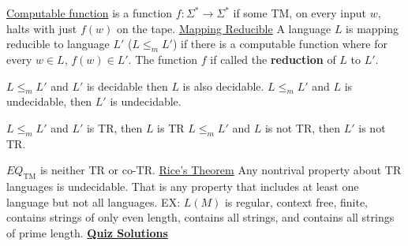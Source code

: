 \documentclass[9pt]{article}
\begin{document}
\uline{Computable function} is a function $f:\Sigma^*\rightarrow\Sigma^*$ if some TM, on every input $w$, halts with just $f(w)$ on the tape.\newline
\uline{Mapping Reducible} A language $L$ is mapping reducible to language $L'$ ($L\leq_mL'$) if there is a computable function where for every $w\in L$, $f(w)\in L'$. The function $f$ if called the \textbf{reduction} of $L$ to $L'$.\newline
\begin{minipage}[t]{.48\textwidth}
    $L\leq_m L'$ and $L'$ is decidable then $L$ is also decidable.\newline
    $L\leq_mL'$ and $L$ is undecidable, then $L'$ is undecidable.
\end{minipage}\hspace{.8cm}
\begin{minipage}[t]{.48\textwidth}
    $L\leq_mL'$ and $L'$ is TR, then $L$ is TR\newline
    $L\leq_mL'$ and $L$ is not TR, then $L'$ is not TR.
\end{minipage}\newline
$EQ_{\text{TM}}$ is neither TR or co-TR.\newline
\uline{Rice's Theorem} Any nontrival property about TR languages is undecidable. That is any property that includes at least one language but not all languages. EX: $L(M)$ is regular, context free, finite, contains strings of only even length, contains all strings, and contains all strings of prime length.\newline
\uline{\textbf{Quiz Solutions}}
\end{document}
